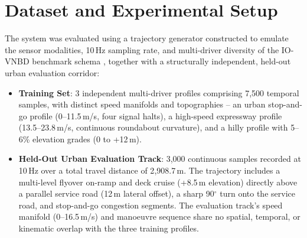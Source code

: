 \documentclass[conference]{IEEEtran}
\begin{document}
\section{Dataset and Experimental Setup}

The system was evaluated using a trajectory generator constructed to emulate the sensor modalities, 10\,Hz sampling rate, and multi-driver diversity of the IO-VNBD benchmark schema \cite{onyekpe2021}, together with a structurally independent, held-out urban evaluation corridor:
\begin{itemize}
\item \textbf{Training Set}: 3 independent multi-driver profiles comprising 7,500 temporal samples, with distinct speed manifolds and topographies -- an urban stop-and-go profile (0--11.5\,m/s, four signal halts), a high-speed expressway profile (13.5--23.8\,m/s, continuous roundabout curvature), and a hilly profile with 5--6\% elevation grades (0 to +12\,m).
\item \textbf{Held-Out Urban Evaluation Track}: 3,000 continuous samples recorded at 10\,Hz over a total travel distance of 2{,}908.7\,m. The trajectory includes a multi-level flyover on-ramp and deck cruise (+8.5\,m elevation) directly above a parallel service road (12\,m lateral offset), a sharp 90$^\circ$ turn onto the service road, and stop-and-go congestion segments. The evaluation track's speed manifold (0--16.5\,m/s) and manoeuvre sequence share no spatial, temporal, or kinematic overlap with the three training profiles.
\end{itemize}
\end{document}

